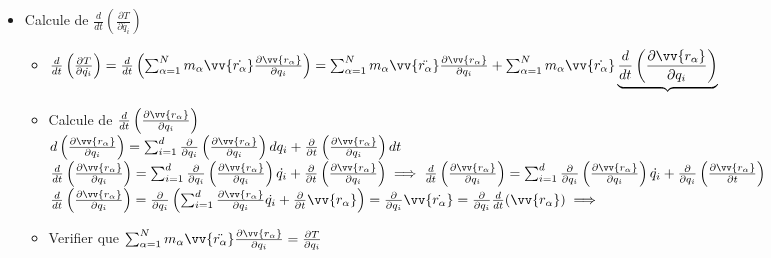 \documentclass[12pt]{book}
\begin{document}
\begin{itemize}
                \item Calcule de $\frac{d}{dt}\left( \frac{\partial T}{\partial \dot{q_i}} \right)$ \\
                \begin{itemize}
                    \item $ \frac{d}{dt}\left( \frac{\partial T}{\partial \dot{q_i}} \right) =\frac{d}{dt}\left( \sum^N_{\alpha = 1}m_\alpha\vv{\dot{r_\alpha}}\frac{\partial \vv{r_\alpha}}{\partial q_i} \right) = \sum^N_{\alpha = 1}m_\alpha \vv{\ddot{r_\alpha}} \frac{\partial \vv{r_\alpha}}{\partial q_i} + \sum^N_{\alpha = 1}m_\alpha\vv{\dot{r_\alpha}}\underbrace{\frac{d}{dt}\left( \frac{\partial \vv{r_\alpha}}{\partial q_i} \right)}$ \\
                    \item Calcule de $\frac{d}{dt}\left( \frac{\partial \vv{r_\alpha}}{\partial q_i} \right)$ \\ 
                        $d\left( \frac{\partial \vv{r_\alpha}}{\partial q_i} \right) = \sum^d_{i=1}\frac{\partial}{\partial q_i} \left( \frac{\partial \vv{r_\alpha}}{\partial q_i} \right)dq_i + \frac{\partial}{\partial t}\left( \frac{\partial \vv{r_\alpha}}{\partial q_i} \right)dt$\\
                        $\frac{d}{dt}\left( \frac{\partial \vv{r_\alpha}}{\partial q_i} \right) = \sum^d_{i=1}\frac{\partial}{\partial q_i} \left( \frac{\partial \vv{r_\alpha}}{\partial q_i} \right)\dot{q_i} + \frac{\partial}{\partial t}\left( \frac{\partial \vv{r_\alpha}}{\partial q_i} \right) \implies \frac{d}{dt}\left( \frac{\partial \vv{r_\alpha}}{\partial q_i} \right) = \sum^d_{i=1}\frac{\partial}{\partial q_i} \left( \frac{\partial \vv{r_\alpha}}{\partial q_i} \right)\dot{q_i} + \frac{\partial}{\partial q_i}\left( \frac{\partial \vv{r_\alpha}}{\partial t} \right)$\\
                        $\frac{d}{dt}\left( \frac{\partial \vv{r_\alpha}}{\partial q_i} \right) = \frac{\partial}{\partial q_i} \left( \sum^d_{i=1} \frac{\partial\vv{r_\alpha}}{\partial q_i} \dot{q_i} + \frac{\partial}{\partial t}\vv{r_\alpha} \right) = \frac{\partial}{\partial q_i}\vv{\dot{r_\alpha}} = \frac{\partial}{\partial q_i}\frac{d}{dt}(\vv{r_\alpha}) \implies $  \\
                    \item Verifier que $\sum^N_{\alpha = 1}m_\alpha \vv{\ddot{r_\alpha}} \frac{\partial \vv{r_\alpha}}{\partial q_i} = \frac{\partial T}{\partial q_i} $\\

\end{itemize}
\end{itemize}
\end{document}
